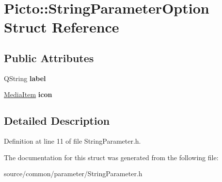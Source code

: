 \hypertarget{struct_picto_1_1_string_parameter_option}{\section{Picto\-:\-:String\-Parameter\-Option Struct Reference}
\label{struct_picto_1_1_string_parameter_option}
}
\subsection*{Public Attributes}
\begin{DoxyCompactItemize}
\item 
\hypertarget{struct_picto_1_1_string_parameter_option_a3d9421acf60da4ff19ddac5011d3459c}{Q\-String {\bfseries label}}\label{struct_picto_1_1_string_parameter_option_a3d9421acf60da4ff19ddac5011d3459c}

\item 
\hypertarget{struct_picto_1_1_string_parameter_option_af4cf169e980c7afa42a7a65d74ba650f}{\hyperlink{class_picto_1_1_media_item}{Media\-Item} {\bfseries icon}}\label{struct_picto_1_1_string_parameter_option_af4cf169e980c7afa42a7a65d74ba650f}

\end{DoxyCompactItemize}


\subsection{Detailed Description}


Definition at line 11 of file String\-Parameter.\-h.



The documentation for this struct was generated from the following file\-:\begin{DoxyCompactItemize}
\item 
source/common/parameter/String\-Parameter.\-h\end{DoxyCompactItemize}
